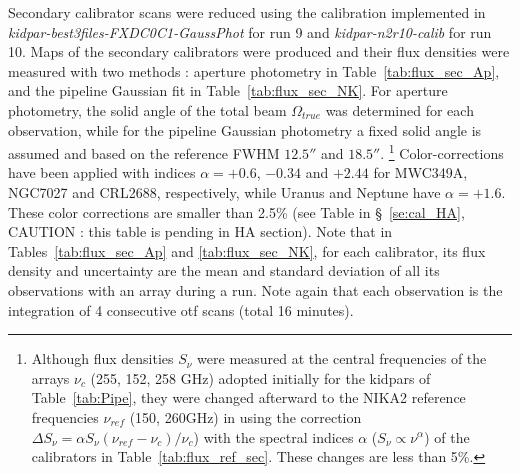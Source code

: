 Secondary calibrator scans were reduced using the calibration
implemented in {\it kidpar-best3files-FXDC0C1-GaussPhot} for run 9 and
{\it kidpar-n2r10-calib} for run 10.
Maps of the secondary calibrators were produced and their
flux densities  were measured with two methods : aperture photometry
in Table~\ref{tab:flux_sec_Ap},
and  the pipeline Gaussian fit in Table~\ref{tab:flux_sec_NK}.
For aperture photometry, the solid angle of the total beam $\Omega_{true}$
was determined for each observation, while for the pipeline Gaussian
photometry a fixed solid angle is assumed
and based on the reference FWHM $12.5''$ and $18.5''$.
\footnote {Although flux densities  $S_{\nu}$ were measured at 
the central frequencies of the arrays $\nu_c$ (255, 152, 258 GHz) adopted initially for
the kidpars of Table~\ref{tab:Pipe}, they were changed afterward to the NIKA2 reference
frequencies  $\nu_{ref}$  (150, 260GHz) in using  the correction 
$\Delta S_{\nu}  = \alpha S_{\nu} (\nu_{ref}-\nu_c)/\nu_c $) with the spectral indices $\alpha$ 
($S_{\nu} \propto \nu^{\alpha}$) of the calibrators in Table~\ref{tab:flux_ref_sec}. These changes are less than 5\%.}
Color-corrections have been applied
with indices $\alpha=+0.6$, $-0.34$ and $+2.44$ for MWC349A, NGC7027 and CRL2688, respectively, while Uranus and
Neptune have $\alpha=+1.6$. These color corrections are smaller than 2.5\% (see Table in
\S~\ref{se:cal_HA}, CAUTION : this table is pending in  HA section).  
Note that in Tables~\ref{tab:flux_sec_Ap} and \ref{tab:flux_sec_NK}, for each calibrator, its
flux density and uncertainty  are  the mean and
standard deviation of all its observations with an array during a run.   
Note again that each observation is the integration of 4 consecutive otf scans (total 16 minutes). 

